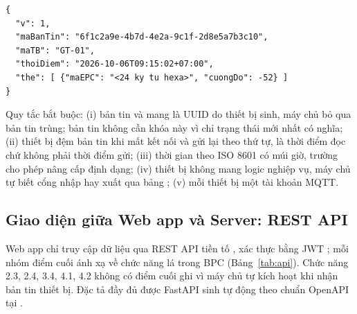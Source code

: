 \begin{lstlisting}[style=json, caption={Mẫu bản tin đọc thẻ}, label={lst:bantin}]
{
  "v": 1,
  "maBanTin": "6f1c2a9e-4b7d-4e2a-9c1f-2d8e5a7b3c10",
  "maTB": "GT-01",
  "thoiDiem": "2026-10-06T09:15:02+07:00",
  "the": [ {"maEPC": "<24 ky tu hexa>", "cuongDo": -52} ]
}
\end{lstlisting}

Quy tắc bắt buộc: (i) bản tin  và  mang  là UUID do thiết bị sinh, máy chủ bỏ qua bản tin trùng; bản tin  không cần khóa này vì chỉ trạng thái mới nhất có nghĩa; (ii) thiết bị đệm bản tin khi mất kết nối và gửi lại theo thứ tự,  là thời điểm đọc chứ không phải thời điểm gửi; (iii) thời gian theo ISO 8601 có múi giờ, trường  cho phép nâng cấp định dạng; (iv) thiết bị không mang logic nghiệp vụ, máy chủ tự biết cổng nhập hay xuất qua bảng ; (v) mỗi thiết bị một tài khoản MQTT.

\subsection{Giao diện giữa Web app và Server: REST API}

Web app chỉ truy cập dữ liệu qua REST API tiền tố , xác thực bằng JWT \cite{rfc7519}; mỗi nhóm điểm cuối ánh xạ về chức năng lá trong BPC (Bảng~\ref{tab:api}). Chức năng 2.3, 2.4, 3.4, 4.1, 4.2 không có điểm cuối ghi vì máy chủ tự kích hoạt khi nhận bản tin thiết bị. Đặc tả đầy đủ được FastAPI sinh tự động theo chuẩn OpenAPI tại .


